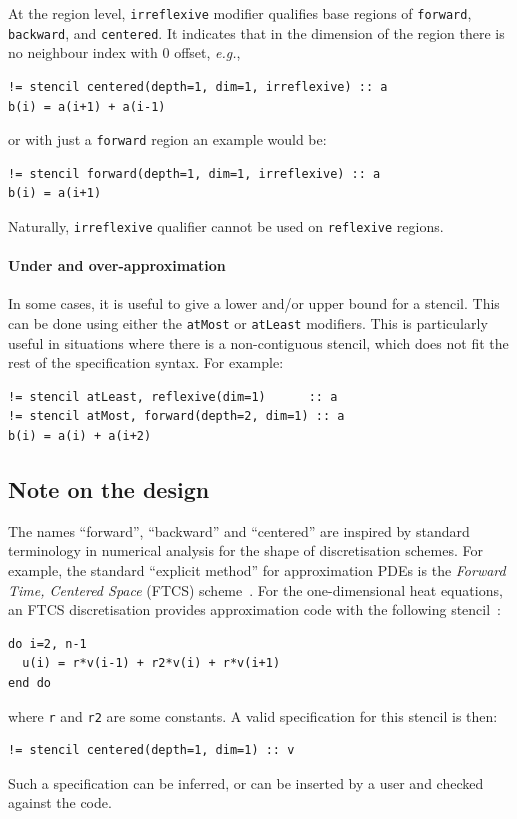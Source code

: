 \documentclass[9pt]{sigplanconf}
\theoremstyle{definition}
\newcommand{\eg}{\emph{e.g.}}
\newcommand{\term}[1]{\texttt{#1}}
\begin{document}
At the region level, \texttt{irreflexive} modifier qualifies base
regions of \texttt{forward}, \texttt{backward}, and \texttt{centered}.
It indicates that in the dimension of the region there is no neighbour index
with $0$ offset, \eg{},
%
\begin{verbatim}
!= stencil centered(depth=1, dim=1, irreflexive) :: a
b(i) = a(i+1) + a(i-1)
\end{verbatim}
%
or with just a \texttt{forward} region an example would be:
%
\begin{verbatim}
!= stencil forward(depth=1, dim=1, irreflexive) :: a
b(i) = a(i+1)
\end{verbatim}

Naturally, \term{irreflexive} qualifier cannot be used on \term{reflexive}
regions.

\paragraph{Under and over-approximation}

In some cases, it is useful to give a lower and/or upper bound for a
stencil. This can be done using either the \term{atMost} or
\term{atLeast} modifiers. This is particularly useful in situations
where there is a non-contiguous stencil, which does not fit the rest
of the specification syntax. For example:
\begin{verbatim}
!= stencil atLeast, reflexive(dim=1)      :: a
!= stencil atMost, forward(depth=2, dim=1) :: a
b(i) = a(i) + a(i+2)
\end{verbatim}


\subsection{Note on the design}

The names ``forward'', ``backward'' and ``centered''
are inspired by standard terminology in numerical analysis
for the shape of discretisation schemes. For example,
the standard ``explicit method'' for approximation
PDEs is the \emph{Forward Time, Centered Space} (FTCS)
scheme~\cite{dawson1991finite}. For
the one-dimensional heat equations, an FTCS discretisation
provides approximation code with the following stencil~\cite{recktenwald2004finite}:
\begin{verbatim}
do i=2, n-1
  u(i) = r*v(i-1) + r2*v(i) + r*v(i+1)
end do
\end{verbatim}
where \texttt{r} and \texttt{r2} are some constants.
A valid specification for this stencil is then:
\begin{verbatim}
!= stencil centered(depth=1, dim=1) :: v
\end{verbatim}
Such a specification can be inferred, or can be inserted by a user
and checked against the code.
\end{document}
